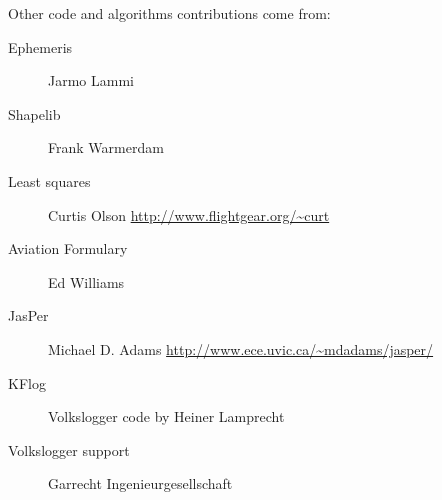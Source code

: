 Other code and algorithms contributions come from:
\begin{description}
\item[Ephemeris] Jarmo Lammi
\item[Shapelib] Frank Warmerdam
\item[Least squares] Curtis Olson \url{http://www.flightgear.org/~curt}
\item[Aviation Formulary] Ed Williams
\item[JasPer] Michael D. Adams \url{http://www.ece.uvic.ca/~mdadams/jasper/}
\item[KFlog] Volkslogger code by Heiner Lamprecht
\item[Volkslogger support] Garrecht Ingenieurgesellschaft
\end{description}
